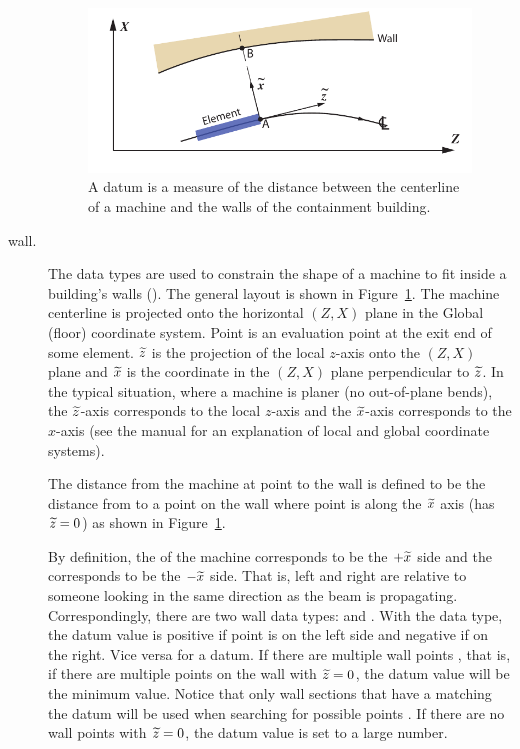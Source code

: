 \begin{description}
\begin{figure}
  \centering
  \includegraphics[width=5in]{building-wall-constraint.pdf}
  \caption[Building wall datum]
{A  datum is a measure of the distance between the
centerline of a machine and the walls of the containment building.}
  \label{f:wall.constraint}
\end{figure}

  \item[wall.] \Newline
The  data types are used to constrain the shape of a machine
to fit inside a building's walls (). The general
layout is shown in Figure~\ref{f:wall.constraint}. The machine
centerline is projected onto the horizontal $(Z, X)$ plane in the
Global (floor) coordinate system. Point  is an evaluation point
at the exit end of some element. $\widetilde z$ is the projection of the
local $z$-axis onto the $(Z, X)$ plane and $\widetilde x$ is the coordinate
in the $(Z, X)$ plane perpendicular to $\widetilde z$. In the typical
situation, where a machine is planer (no out-of-plane bends), the $\widetilde
z$-axis corresponds to the local $z$-axis and the $\widetilde x$-axis
corresponds to the $x$-axis (see the \bmad manual for an explanation
of local and global coordinate systems).

The distance from the machine at point  to the wall is defined
to be the distance from  to a point  on the wall where
point  is along the $\widetilde x$ axis (has $\widetilde z = 0$) as shown in
Figure~\ref{f:wall.constraint}.

By definition, the  of the machine corresponds to be
the $+\widetilde x$ side and the  corresponds to be the
$-\widetilde x$ side. That is, left and right are relative to someone looking
in the same direction as the beam is propagating. Correspondingly,
there are two wall data types:  and
. With the  data type, the
datum value is positive if point  is on the left side and
negative if on the right. Vice versa for a  datum.
If there are multiple wall points , that is, if there are
multiple points on the wall with $\widetilde z = 0$, the datum value will be
the minimum value. Notice that only wall sections that have a
 matching the datum will be used when searching for
possible points . If there are no wall points with $\widetilde z = 0$,
the datum value is set to a large number.


\end{description}
